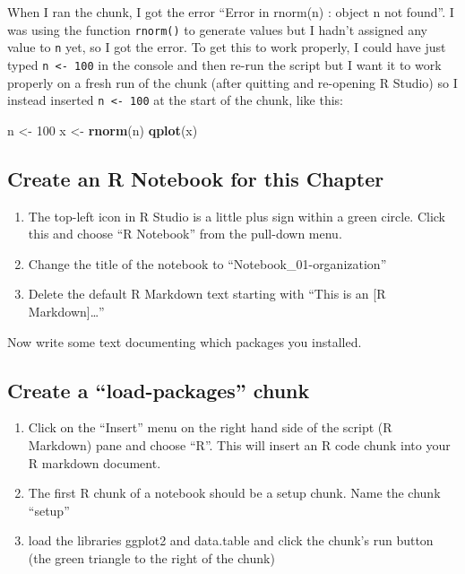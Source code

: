 \documentclass[]{book}
\newenvironment{Shaded}{\begin{snugshade}}{\end{snugshade}}
\newcommand{\KeywordTok}[1]{\textcolor[rgb]{0.13,0.29,0.53}{\textbf{#1}}}
\newcommand{\DecValTok}[1]{\textcolor[rgb]{0.00,0.00,0.81}{#1}}
\newcommand{\StringTok}[1]{\textcolor[rgb]{0.31,0.60,0.02}{#1}}
\newcommand{\NormalTok}[1]{#1}
\providecommand{\tightlist}{%
  \setlength{\itemsep}{0pt}\setlength{\parskip}{0pt}}
\begin{document}
When I ran the chunk, I got the error ``Error in rnorm(n) : object n not
found''. I was using the function \texttt{rnorm()} to generate values
but I hadn't assigned any value to \texttt{n} yet, so I got the error.
To get this to work properly, I could have just typed
\texttt{n\ \textless{}-\ 100} in the console and then re-run the script
but I want it to work properly on a fresh run of the chunk (after
quitting and re-opening R Studio) so I instead inserted
\texttt{n\ \textless{}-\ 100} at the start of the chunk, like this:

\begin{Shaded}
\begin{Highlighting}[]
\NormalTok{n <-}\StringTok{ }\DecValTok{100}
\NormalTok{x <-}\StringTok{ }\KeywordTok{rnorm}\NormalTok{(n)}
\KeywordTok{qplot}\NormalTok{(x)}
\end{Highlighting}
\end{Shaded}

\subsection{Create an R Notebook for this
Chapter}\label{create-an-r-notebook-for-this-chapter}

\begin{enumerate}
\def\labelenumi{\arabic{enumi}.}
\tightlist
\item
  The top-left icon in R Studio is a little plus sign within a green
  circle. Click this and choose ``R Notebook'' from the pull-down menu.
\item
  Change the title of the notebook to ``Notebook\_01-organization''
\item
  Delete the default R Markdown text starting with ``This is an {[}R
  Markdown{]}\ldots{}''
\end{enumerate}

Now write some text documenting which packages you installed.

\subsection{\texorpdfstring{Create a ``load-packages''
chunk}{Create a load-packages chunk}}\label{create-a-load-packages-chunk}

\begin{enumerate}
\def\labelenumi{\arabic{enumi}.}
\tightlist
\item
  Click on the ``Insert'' menu on the right hand side of the script (R
  Markdown) pane and choose ``R''. This will insert an R code chunk into
  your R markdown document.
\item
  The first R chunk of a notebook should be a setup chunk. Name the
  chunk ``setup''
\item
  load the libraries ggplot2 and data.table and click the chunk's run
  button (the green triangle to the right of the chunk)
\end{enumerate}
\end{document}
